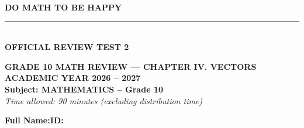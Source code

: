 \documentclass[10pt,a4paper]{article}
\begin{document}
\noindent
\begin{minipage}[c]{0.38\textwidth}
    \centering
    \textbf{DO MATH TO BE HAPPY}\\[-2pt]
    \rule{3.2cm}{0.6pt}\\[2pt]
    \textbf{OFFICIAL REVIEW TEST 2}
\end{minipage}\hfill
\begin{minipage}[c]{0.52\textwidth}
    \centering
    \textbf{GRADE 10 MATH REVIEW — CHAPTER IV. VECTORS}\\[1pt]
    \textbf{ACADEMIC YEAR 2026 -- 2027}\\[1pt]
    \textbf{Subject: MATHEMATICS -- Grade 10}\\
    \textit{\small Time allowed: 90 minutes (excluding distribution time)}
\end{minipage}

\vspace{0.05cm}
\noindent
\begin{minipage}[b]{0.78\textwidth}
    \textbf{Full Name:}\dotfill\textbf{ID:}\makebox[3.5cm]{\dotfill}
\end{minipage}\hfill
\begin{minipage}[b]{0.20\textwidth}
    \hfill
    \setlength{\fboxrule}{0.8pt}%
\end{minipage}
\vspace{0.05cm}
\end{document}
